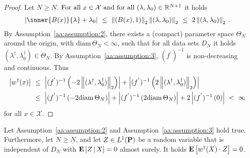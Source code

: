 \begin{proof}
  Let $N\ge \underline{N}$.
  $
    \text{For all}\ 
    x\in\mathcal{X}
    \
    \text{and for all}\ 
    (\lambda,\lambda_0)\in \R^{N+1}
  $ it holds
  \begin{gather*}
    \left| 
    \inner{B(x)}{\lambda}
    +
    \lambda_0
    \right|
    \ 
    \le
    \ 
    \norm{(B(x),1)}_2
    \norm{(\lambda,\lambda_0)}_2
    \ 
    \le
    \ 
    2
    \norm{(\lambda,\lambda_0)}_2
    \,.
  \end{gather*}
  By Assumption~\ref{aa:assumption:2}, 
  there exists a (compact) parameter space
  $\Theta_N$ around the origin, with $\mathrm{diam}\,  \Theta_N<\infty$, 
  such that for all data sets $D_N$ it holds  $(\lambda^\dagger,\lambda_0^\dagger)\in\Theta_N$.
  By Assumption~\ref{aa:assumption:3}, $(f^{'})^{-1}$ is non-decreasing and continuous. Thus
  \begin{align*}
    \left| 
    w^\dagger(x)
    \right|
    &
    \ 
    \le
    \ 
    \left| 
    (f^{'})^{-1}
    \left( 
      -2
      \norm{(\lambda^\dagger,\lambda^\dagger_0)}_2
    \right)
    \right|
    +
    \left| 
    (f^{'})^{-1}
    \left( 
      2
      \norm{(\lambda^\dagger,\lambda^\dagger_0)}_2
    \right)
    \right|
    \\
    &
    \ 
    \le
    \ 
    \left| 
    (f^{'})^{-1}
    \left( 
      -2
      \mathrm{diam}\,\Theta_N
    \right)
    \right|
    +
    \left| 
    (f^{'})^{-1}
    \left( 
      2
      \mathrm{diam}\,\Theta_N
    \right)
    \right|
    +
    2
    \left| 
    (f^{'})^{-1}
    \left( 
      0
    \right)
    \right|
    \ 
    <
    \ 
    \infty
  \end{align*}
  for all $x\in\mathcal{X}$.
\end{proof}
\begin{lemma}
  \label{w.Z=0}
  Let Assumption~\ref{aa:assumption:2} and Assumption~\ref{aa:assumption:3} hold true.
  Furthermore, 
  let
  $N\ge\underline{N}$, and
  let
  $Z\in L^1(\P)$
  be a random variable that is independent of $D_N$ 
  with
  $
\E
\left[
  Z
  \,
  |
  \, 
  X
\right]
= 0
  $
  almost surely.
  It holds
  $
  \E
  \left[
  w^\dagger(X)\cdot Z
  \right]
  =0
  $.
\end{lemma}
